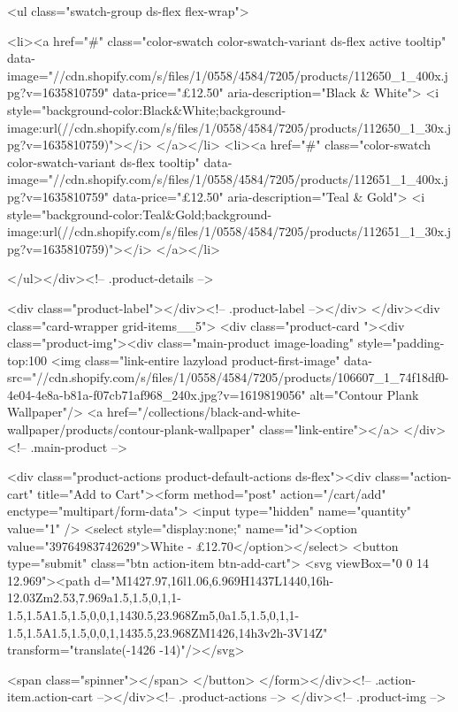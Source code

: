 {{{{{{{<ul class="swatch-group ds-flex flex-wrap">
        
<li><a href="#" class="color-swatch color-swatch-variant ds-flex active tooltip" data-image="//cdn.shopify.com/s/files/1/0558/4584/7205/products/112650_1_400x.jpg?v=1635810759" data-price="£12.50" aria-description="Black & White">
              <i style="background-color:Black&White;background-image:url(//cdn.shopify.com/s/files/1/0558/4584/7205/products/112650_1_30x.jpg?v=1635810759)"></i>
            </a></li>
<li><a href="#" class="color-swatch color-swatch-variant ds-flex tooltip" data-image="//cdn.shopify.com/s/files/1/0558/4584/7205/products/112651_1_400x.jpg?v=1635810759" data-price="£12.50" aria-description="Teal & Gold">
              <i style="background-color:Teal&Gold;background-image:url(//cdn.shopify.com/s/files/1/0558/4584/7205/products/112651_1_30x.jpg?v=1635810759)"></i>
            </a></li>

      </ul></div><!-- .product-details -->

<div class="product-label"></div><!-- .product-label --></div>
          </div><div class="card-wrapper grid-items__5">
            <div class="product-card "><div class="product-img"><div class="main-product image-loading" style="padding-top:100%
      <img class="link-entire lazyload product-first-image" data-src="//cdn.shopify.com/s/files/1/0558/4584/7205/products/106607_1_74f18df0-4e04-4e8a-b81a-f07cb71af968_240x.jpg?v=1619819056" alt="Contour Plank Wallpaper"/>
      <a href="/collections/black-and-white-wallpaper/products/contour-plank-wallpaper" class="link-entire"></a>
    </div><!-- .main-product -->
  
<div class="product-actions product-default-actions ds-flex"><div class="action-cart" title="Add to Cart"><form method="post" action="/cart/add" enctype="multipart/form-data">
            <input type="hidden" name="quantity" value="1" />
            <select style="display:none;" name="id"><option value="39764983742629">White - £12.70</option></select>
            <button type="submit" class="btn action-item btn-add-cart">
              <svg viewBox="0 0 14 12.969"><path d="M1427.97,16l1.06,6.969H1437L1440,16h-12.03Zm2.53,7.969a1.5,1.5,0,1,1-1.5,1.5A1.5,1.5,0,0,1,1430.5,23.968Zm5,0a1.5,1.5,0,1,1-1.5,1.5A1.5,1.5,0,0,1,1435.5,23.968ZM1426,14h3v2h-3V14Z" transform="translate(-1426 -14)"/></svg>

              <span class="spinner"></span>
            </button>
          </form></div><!-- .action-item.action-cart --></div><!-- .product-actions -->
</div><!-- .product-img -->

}}}}}}}
